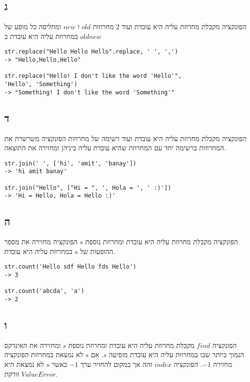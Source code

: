 \documentclass[12pt]{report}
\begin{document}
\subsection*{ג}
הפונקציה מקבלת מחרוזת עליה היא עובדת ועוד 2 מחרוזות $old$ ו $new$ ומחליפה כל מופע של $old$ במחרוזת עליה היא עובדת ב$new$
\begin{lstlisting}
str.replace("Hello Hello Hello".replace, ' ', ',')
-> "Hello,Hello,Hello"

str.replace("Hello! I don't like the word 'Hello'",
'Hello', 'Something')
-> "Something! I don't like the word 'Something'"
\end{lstlisting}

\subsection*{ד}
הפונקציה מקבלת מחרוזת עליה היא עובדת ועוד רשימה של מחרוזות
הפונקציה משרשרת את המחרוזות ברשימה יחד עם המחרוזת שהיא עובדת עליה ביניהן ומחזירה את התוצאה.

\begin{lstlisting}
str.join(' ', ['hi', 'amit', 'banay'])
-> 'hi amit banay'

str.join("Hello", ["Hi = ", ', Hola = ', ' :)'])
-> 'Hi = Hello, Hola = Hello :)'
\end{lstlisting}

\subsection*{ה}
הפונקציה מקבלת מחרוזת עליה היא עובדת ומחרוזת נוספת $s$
הפונקציה מחזירה את מספר ההופעות של $s$ במחרוזת עליה היא עובדת.

\begin{lstlisting}
str.count('Hello sdf Hello fds Hello') 
-> 3

str.count('abcda', 'a')
-> 2
\end{lstlisting}

\subsection*{ו}
הפונקציה $find$ מקבלת מחרוזת עליה היא עובדת  ומחרוזת נוספת $s$ ומחזירה את האינדקס הנמוך ביותר שבו במחרוזת עליה היא עובדת מופיעה $s$.
אם $s$ לא נמצאת במחרוזת הפונקציה מחזירה $-1$.
הפונקציה $index$ זהה אך במקום להחזיר ערך $-1$ כאשר $s$ לא נמצאת היא זורקת $ValueError$.
\end{document}
